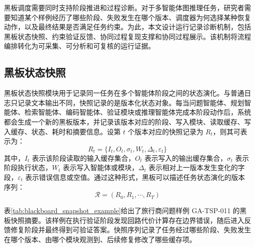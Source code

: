 黑板调度需要同时支持阶段推进和过程诊断。对于多智能体图推理任务，研究者需要知道某个样例经历了哪些阶段、失败发生在哪个版本、调度器为何选择某种恢复动作，以及最终结果是否满足任务约束。为此，本文设计运行记录诊断机制，包括黑板状态快照、约束验证反馈、协同过程复现支撑和协同过程展示。该机制将流程编排转化为可采集、可分析和可复核的运行证据。

\subsection{黑板状态快照}

黑板状态快照模块用于记录同一任务在多个智能体阶段之间的状态演化。与普通日志只记录文本输出不同，快照记录的是版本化状态对象。每当问题智能体、规划智能体、检索智能体、编码智能体、验证模块或推理智能体完成本阶段动作后，系统都会生成一个新的黑板版本，并记录该版本对应的阶段、写入模块、读取缓存、写入缓存、状态、耗时和摘要信息。设第 $t$ 个版本对应的快照记录为 $R_t$，则其可表示为：
\begin{equation}
R_t=\{I_t,O_t,\sigma_t,W_t,\Delta_t,\varepsilon_t\}
\end{equation}
其中，$I_t$ 表示该阶段读取的输入缓存集合，$O_t$ 表示写入的输出缓存集合，$\sigma_t$ 表示阶段执行状态，$W_t$ 表示写入智能体或模块，$\Delta_t$ 表示相对上一版本发生变化的字段，$\varepsilon_t$ 表示错误信息或空值。通过这种形式，黑板可以描述任务状态演化的版本序列：
\begin{equation}
\mathcal{R}=(R_0,R_1,\cdots,R_T)
\end{equation}

表\ref{tab:blackboard_snapshot_example}给出了旅行商问题样例 GA-TSP-011 的黑板快照摘要。该样例在执行验证阶段发现回路代价计算存在边界错误，随后进入反馈修复阶段并最终得到可验证答案。快照序列记录了任务经过哪些阶段、失败发生在哪个版本、由哪个模块观测到、后续修复修改了哪些缓存项。

